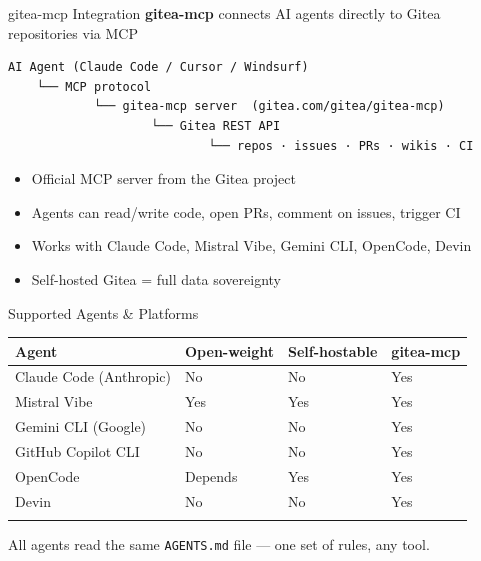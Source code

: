 \documentclass[
  ignorenonframetext,
  aspectratio=169,
]{beamer}
\providecommand{\tightlist}{%
  \setlength{\itemsep}{0pt}\setlength{\parskip}{0pt}}
\begin{document}
\begin{frame}[fragile]{gitea-mcp Integration}
\label{gitea-mcp-integration}
\textbf{gitea-mcp} connects AI agents directly to Gitea repositories via
MCP

\begin{verbatim}
AI Agent (Claude Code / Cursor / Windsurf)
    └── MCP protocol
            └── gitea-mcp server  (gitea.com/gitea/gitea-mcp)
                    └── Gitea REST API
                            └── repos · issues · PRs · wikis · CI
\end{verbatim}

\begin{itemize}
\tightlist
\item
  Official MCP server from the Gitea project
\item
  Agents can read/write code, open PRs, comment on issues, trigger CI
\item
  Works with Claude Code, Mistral Vibe, Gemini CLI, OpenCode, Devin
\item
  Self-hosted Gitea = full data sovereignty
\end{itemize}
\end{frame}

\begin{frame}[fragile]{Supported Agents \& Platforms}
\label{supported-agents-platforms}
\begin{longtable}[]{@{}llll@{}}
\toprule\noalign{}
Agent & Open-weight & Self-hostable & gitea-mcp \\
\midrule\noalign{}
\endhead
Claude Code (Anthropic) & No & No & Yes \\
Mistral Vibe & Yes & Yes & Yes \\
Gemini CLI (Google) & No & No & Yes \\
GitHub Copilot CLI & No & No & Yes \\
OpenCode & Depends & Yes & Yes \\
Devin & No & No & Yes \\
\bottomrule\noalign{}
\end{longtable}

\vspace{0.3em}

All agents read the same \texttt{AGENTS.md} file --- one set of rules,
any tool.
\end{frame}
\end{document}
